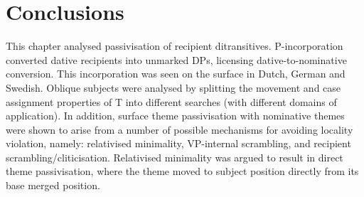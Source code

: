\section{Conclusions}
This chapter analysed passivisation of recipient ditransitives. P-incorporation converted dative recipients into unmarked DPs, licensing dative-to-nominative conversion. This incorporation was seen on the surface in Dutch, German and Swedish. Oblique subjects were analysed by splitting the movement and case assignment properties of T into different searches (with different domains of application). In addition, surface theme passivisation with nominative themes were shown to arise from a number of possible mechanisms for avoiding locality violation, namely: relativised minimality, VP-internal scrambling, and recipient scrambling/cliticisation. Relativised minimality was argued to result in direct theme passivisation, where the theme moved to subject position directly from its base merged position.

%

